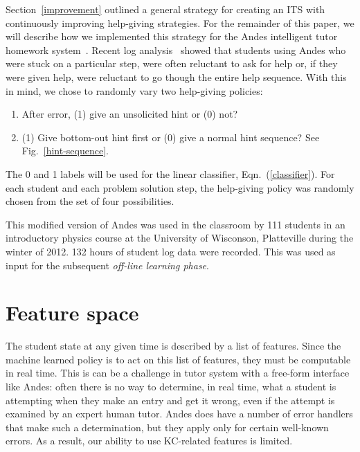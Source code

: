 \documentclass{edm_template}
\begin{document}
Section~\ref{improvement} outlined a general strategy for creating an
ITS with continuously improving help-giving strategies.  For the
remainder of this paper, we will describe how we implemented this
strategy for the Andes intelligent tutor homework system~\cite{vanlehn_andes_2005}.  
Recent log analysis~\cite{ranganathan_what_2013} showed that students 
using Andes
who were stuck on a particular step, were often reluctant to ask for
help or, if they were given help, were reluctant to go though the entire help
sequence.  With this in mind, we chose to randomly vary two
help-giving policies: 
%
\begin{enumerate} 
\item After error, (1) give an unsolicited hint or (0) not?
\item (1) Give bottom-out hint first or (0) give a normal hint sequence? See Fig.~\ref{hint-sequence}.
\end{enumerate}
%
The 0 and 1 labels will be used for the linear classifier, Eqn.~(\ref{classifier}).
For each student and each
problem solution step, the help-giving policy was randomly chosen from
the set of four possibilities.

This modified version of Andes was used in the classroom by 111 students
in an introductory physics course at the University of Wisconson, Platteville during the
winter of 2012.   132 hours of student log data were recorded.  This
was used as input for the subsequent {\em off-line learning phase}.

\section{Feature space}

The student state at any given time is described by a list of
features.   Since the machine learned policy is to act on this list of
features, they must be computable in real time.  This is can be a
challenge in tutor system with a free-form interface like  Andes:
often there is no way to determine, in real time, what a student is
attempting when they make an entry and get it wrong, even if the attempt
is examined by an expert human tutor.  Andes does have a
number of error handlers that make such a determination, but they 
apply only for certain well-known errors.  As a result, our ability to use
KC-related features is limited.
\end{document}
